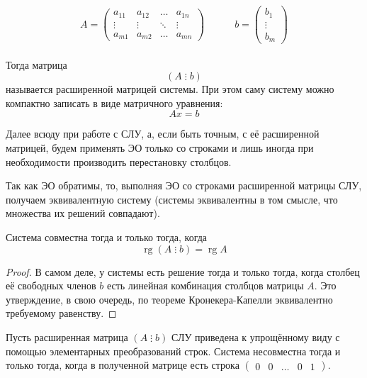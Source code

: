 \documentclass[11pt]{article}
\DeclareMathOperator{\rg}{rg}
\begin{document}
\begin{equation*}
    A = 
    \begin{pmatrix}
        a_{11} & a_{12} & \ldots & a_{1n} \\
        \vdots & \vdots & \ddots & \vdots \\
        a_{m1} & a_{m2} & \ldots & a_{mn}
    \end{pmatrix}
    \quad \quad \quad
    b = 
    \begin{pmatrix}
        b_1 \\
        \vdots \\
        b_m
    \end{pmatrix}
\end{equation*} \leavevmode
\\
Тогда матрица 
\[\left(A \; \vdots \; b\right)\] 
называется расширенной матрицей системы. При этом саму систему можно 
компактно записать в виде матричного уравнения:
\[Ax = b\]

\begin{remark}
    Далее всюду при работе с СЛУ, а, если быть точным, с её расширенной матрицей, будем применять ЭО только со
    строками и лишь иногда при необходимости производить перестановку столбцов.
\end{remark}

\begin{remark}
    Так как ЭО обратимы, то, выполняя ЭО со строками расширенной матрицы СЛУ, получаем эквивалентную систему (системы эквивалентны в том смысле, что множества их решений совпадают).
\end{remark}

\begin{lemma} \label{lemma:2.1}
    Система совместна тогда и только тогда, когда 
    \[\rg \left(A \; \vdots \; b \right) = \rg A\]
\end{lemma}

\begin{proof}
    В самом деле, у системы есть решение тогда и только тогда, когда столбец её свободных членов 
    $b$ есть линейная комбинация столбцов матрицы $A$. Это утверждение, в свою очередь, по теореме Кронекера-Капелли эквивалентно 
    требуемому равенству.
\end{proof}

\begin{theorem} \label{th:2.1}
    Пусть расширенная матрица $\left(A \; \vdots \; b \right)$ СЛУ приведена к упрощённому виду с помощью элементарных преобразований строк. Система 
    несовместна тогда и только тогда, когда в полученной матрице есть строка 
    $
        \begin{pmatrix}
            0 & 0 & \ldots & 0 & 1
        \end{pmatrix}
    $.
\end{theorem}
\end{document}
